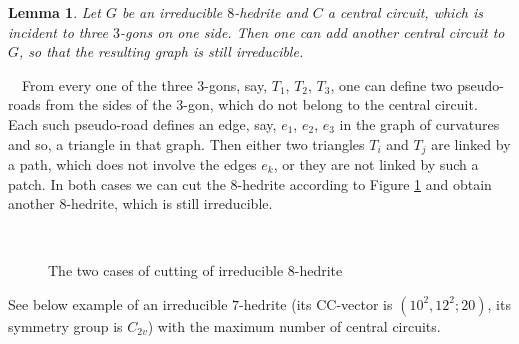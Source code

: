 \documentclass[12pt]{article}
\newtheorem{lemma}{Lemma}
\newcommand{\proof}{\noindent{\bf Proof.}\ \ }
\begin{document}
\begin{lemma}
Let $G$ be an irreducible $8$-hedrite and $C$ a central circuit,
which is incident to three $3$-gons on one side. Then one can add another central circuit to $G$,  so that the resulting graph is still irreducible.
\end{lemma}
\proof From every one of the three $3$-gons, say, $T_1$, $T_2$, $T_3$, one can define two pseudo-roads from the sides of the $3$-gon, which do not belong to the central circuit.
Each such pseudo-road defines an edge, say, $e_1$, $e_2$, $e_3$ in the graph 
of curvatures and so, a triangle in that graph. Then either two triangles 
$T_i$ and $T_j$ are linked by a path, which does not involve the edges $e_k$,
or they are not linked by such a patch. In both cases we can cut the 
$8$-hedrite according to Figure \ref{TwoCasesCutting} and obtain 
another $8$-hedrite, which is still irreducible.


\begin{figure}
\centering
\mbox{
}
\caption{The two cases of cutting of irreducible $8$-hedrite}
\label{TwoCasesCutting}
\end{figure}


















See below example of an irreducible $7$-hedrite (its CC-vector is $(10^2, 12^2; 20)$, its symmetry group is $C_{2v}$) with the maximum number of central circuits.
\end{document}

